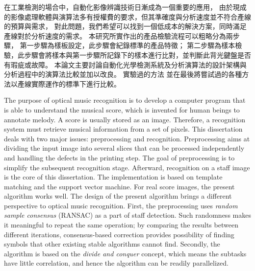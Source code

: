 \begin{abstractzh}
在工業檢測的場合中，自動化影像辨識技術日漸成為一個重要的應用，
由於現成的影像處理軟體與演算法多有授權費的要求，但其準確度與分析速度並不符合產線的預算與需求，
對此問題，我們希望可以找到一個低成本的解決方案，同時滿足產線對於分析速度的需求。
本研究所實作出的產品檢驗流程可以粗略分為兩步驟，
第一步驟為樣板設定，此步驟會紀錄標準的產品特徵；
第二步驟為樣本檢驗，此步驟會將樣本與第一步驟所記錄下的樣本進行比對，並判斷此背光鍵盤是否有瑕疵或故障。
本論文主要討論自動化光學檢測系統及分析演算法的設計架構與分析過程中的演算法比較並加以改良。
實驗過的方法
並在最後將嘗試過的各種方法以產線實際運作的標準下進行比較。
\end{abstractzh}

\begin{abstracten}
The purpose of optical music recognition is to develop a computer program that is able to understand the musical score, which is invented for human beings to annotate melody. A score is usually stored as an image. Therefore, a recognition system must retrieve musical information from a set of pixels.
This dissertation deals with two major issues: preprocessing and recognition. Preprocessing aims at dividing the input image into several slices that can be processed independently and handling the defects in the printing step. The goal of preprocessing is to simplify the subsequent recognition stage. Afterward, recognition on a staff image is the core of this dissertation. The implementation is based on template matching and the support vector machine. For real score images, the present algorithm works well.
The design of the present algorithm brings a different perspective to optical music recognition. First, the preprocessing uses \emph{random sample consensus} (RANSAC) as a part of staff detection. Such randomness makes it meaningful to repeat the same operation; by comparing the results between different iterations, consensus-based correction provides possibility of finding symbols that other existing stable algorithms cannot find. Secondly, the algorithm is based on the \emph{divide and conquer} concept, which means the subtasks have little correlation, and hence the algorithm can be readily parallelized.
\end{abstracten}


\begin{comment}
\category{I2.10}{Computing Methodologies}{Artificial Intelligence --
Vision and Scene Understanding} \category{H5.3}{Information
Systems}{Information Interfaces and Presentation (HCI) -- Web-based
Interaction.}

\terms{Design, Human factors, Performance.}

\keywords{Region of interest, Visual attention model, Web-based
games, Benchmarks.}
\end{comment}
